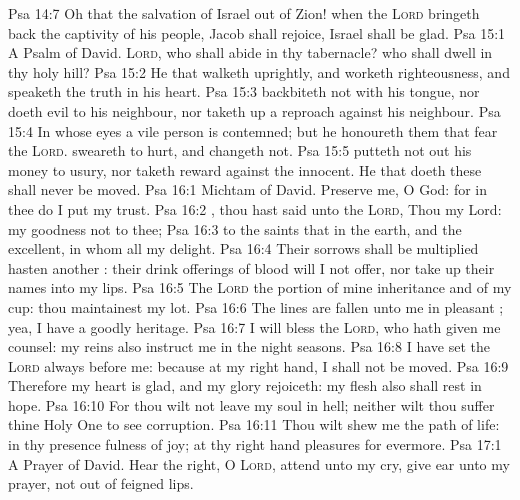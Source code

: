 \vs Psa 14:7 Oh that the salvation of Israel  out of Zion! when the \textsc{Lord} bringeth back the captivity of his people, Jacob shall rejoice,  Israel shall be glad.
\vs Psa 15:1 A Psalm of David. \textsc{Lord}, who shall abide in thy tabernacle? who shall dwell in thy holy hill?
\vs Psa 15:2 He that walketh uprightly, and worketh righteousness, and speaketh the truth in his heart.
\vs Psa 15:3  backbiteth not with his tongue, nor doeth evil to his neighbour, nor taketh up a reproach against his neighbour.
\vs Psa 15:4 In whose eyes a vile person is contemned; but he honoureth them that fear the \textsc{Lord}.  sweareth to  hurt, and changeth not.
\vs Psa 15:5  putteth not out his money to usury, nor taketh reward against the innocent. He that doeth these  shall never be moved.
\vs Psa 16:1 Michtam of David. Preserve me, O God: for in thee do I put my trust.
\vs Psa 16:2 , thou hast said unto the \textsc{Lord}, Thou  my Lord: my goodness  not to thee;
\vs Psa 16:3  to the saints that  in the earth, and  the excellent, in whom  all my delight.
\vs Psa 16:4 Their sorrows shall be multiplied  hasten  another : their drink offerings of blood will I not offer, nor take up their names into my lips.
\vs Psa 16:5 The \textsc{Lord}  the portion of mine inheritance and of my cup: thou maintainest my lot.
\vs Psa 16:6 The lines are fallen unto me in pleasant ; yea, I have a goodly heritage.
\vs Psa 16:7 I will bless the \textsc{Lord}, who hath given me counsel: my reins also instruct me in the night seasons.
\vs Psa 16:8 I have set the \textsc{Lord} always before me: because  at my right hand, I shall not be moved.
\vs Psa 16:9 Therefore my heart is glad, and my glory rejoiceth: my flesh also shall rest in hope.
\vs Psa 16:10 For thou wilt not leave my soul in hell; neither wilt thou suffer thine Holy One to see corruption.
\vs Psa 16:11 Thou wilt shew me the path of life: in thy presence  fulness of joy; at thy right hand  pleasures for evermore.
\vs Psa 17:1 A Prayer of David. Hear the right, O \textsc{Lord}, attend unto my cry, give ear unto my prayer,  not out of feigned lips.
